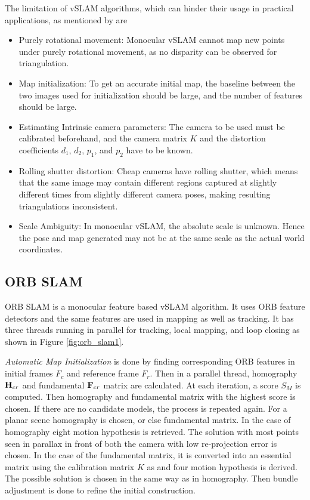 The limitation of vSLAM algorithms, which can hinder their usage in practical applications, as mentioned by  are

\begin{itemize}
	\item Purely rotational movement: Monocular vSLAM cannot map new points under purely rotational movement, as no disparity can be observed for triangulation.
	\item Map initialization: To get an accurate initial map, the baseline between the two images used for initialization should be large, and the number of features should be large. 
	\item Estimating Intrinsic camera parameters: The camera to be used must be calibrated beforehand, and the  camera matrix $K$ and the distortion coefficients $d_1$, $d_2$, $p_1$, and $p_2$ have to be known.
	\item Rolling shutter distortion: Cheap cameras have rolling shutter, which means that the same image may contain different regions captured at slightly different times from slightly different camera poses, making resulting triangulations inconsistent. 
	\item Scale Ambiguity: In monocular vSLAM, the absolute scale is unknown. Hence the pose and map generated may not be at the same scale as the actual world coordinates.
\end{itemize}




\subsection{ORB SLAM}

ORB SLAM \cite{7219438} is a monocular feature based vSLAM algorithm. It uses ORB feature detectors and the same features are used in mapping as well as tracking. It has three threads running in parallel for tracking, local mapping, and loop closing as shown in Figure \ref{fig:orb_slam1}.

\textit{Automatic Map Initialization} is done by finding corresponding ORB features in initial frames $F_c$ and reference frame $F_r$. Then in a parallel thread, homography ${\bf H}_{cr}$ and fundamental ${\bf F}_{cr}$ matrix are calculated. At each iteration, a score $S_M$ is computed. Then homography and fundamental matrix with the highest score is chosen. If there are no candidate models, the process is repeated again. For a planar scene homography is chosen, or else fundamental matrix. In the case of homography eight motion hypothesis is retrieved. The solution with most points seen in parallax in front of both the camera with low re-projection error is chosen. In the case of the fundamental matrix, it is converted into an essential matrix using the calibration matrix $K$ as and four motion hypothesis is derived. The possible solution is chosen in the same way as in homography. Then bundle adjustment is done to refine the initial construction.

